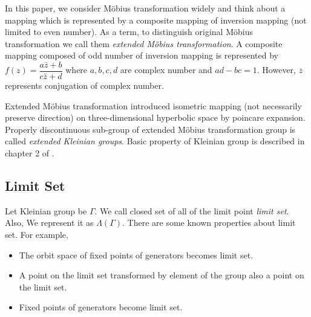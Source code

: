 In this paper, we consider M\"obius transformation widely and
think about a mapping which is represented by a composite mapping of
inversion mapping (not limited to even number).
As a term, to distinguish original M\"obius transformation
we call them \textit{extended M\"obius transformation}.
A composite mapping composed of odd number of inversion mapping
is represented by $f(z)=\dfrac{a{\bar{z}}+b}{c{\bar{z}}+d}$ where
$a, b, c, d$ are complex number and $ad-bc = 1$.
However, $\overline{z}$ represents conjugation of complex number.

Extended M\"obius transformation introduced isometric mapping (not
necessarily preserve direction) on three-dimensional hyperbolic space by
poincare expansion.
Properly discontinuous sub-group of extended M\"obius transformation group
is called \textit{extended Kleinian groups}.
Basic property of Kleinian group is described in chapter 2 of \cite{marden_2016}.


\subsection{Limit Set}

Let Kleinian group be $\Gamma$.
We call closed set of all of the limit point \textit{limit set}.
Also, We represent it as $\Lambda(\Gamma)$.
There are some known properties about limit set.
For example,
\begin{itemize}
 \item The orbit space of fixed points of generators becomes limit set.
 \item A point on the limit set transformed by element of the group 
       also a point on the limit set.
 \item Fixed points of generators become limit set.
\end{itemize}

